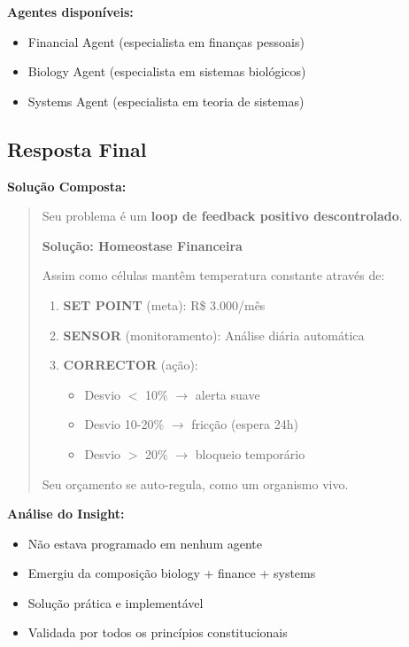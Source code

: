 \documentclass[11pt]{article}
\begin{document}
\textbf{Agentes disponíveis:}
\begin{itemize}
    \item Financial Agent (especialista em finanças pessoais)
    \item Biology Agent (especialista em sistemas biológicos)
    \item Systems Agent (especialista em teoria de sistemas)
\end{itemize}

\subsection{Resposta Final}

\textbf{Solução Composta:}

\begin{quote}
Seu problema é um \textbf{loop de feedback positivo descontrolado}.

\textbf{Solução: Homeostase Financeira}

Assim como células mantêm temperatura constante através de:

\begin{enumerate}
    \item \textbf{SET POINT} (meta): R\$ 3.000/mês
    \item \textbf{SENSOR} (monitoramento): Análise diária automática
    \item \textbf{CORRECTOR} (ação):
    \begin{itemize}
        \item Desvio $<$ 10\% $\rightarrow$ alerta suave
        \item Desvio 10-20\% $\rightarrow$ fricção (espera 24h)
        \item Desvio $>$ 20\% $\rightarrow$ bloqueio temporário
    \end{itemize}
\end{enumerate}

Seu orçamento se auto-regula, como um organismo vivo.
\end{quote}

\textbf{Análise do Insight:}

\begin{itemize}
    \item Não estava programado em nenhum agente
    \item Emergiu da composição biology + finance + systems
    \item Solução prática e implementável
    \item Validada por todos os princípios constitucionais
\end{itemize}
\end{document}
